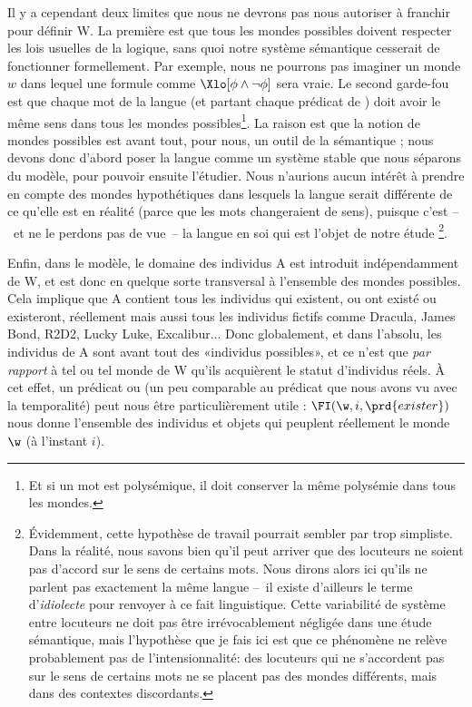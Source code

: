 
Il y a cependant deux limites que nous ne devrons pas nous autoriser à franchir pour définir \Unv W. La première est que tous les mondes possibles doivent respecter les lois  usuelles de la logique, sans quoi notre système sémantique cesserait de fonctionner formellement. Par exemple, nous ne pourrons pas imaginer un monde $w$ dans lequel une formule comme \(\Xlo[\phi\wedge\neg\phi]\) sera vraie. 
Le second garde-fou est que chaque mot de la langue (et partant chaque prédicat de {\LO}) doit avoir le même sens dans tous les mondes possibles\footnote{Et si un mot est polysémique, il doit conserver la même polysémie dans tous les mondes.}.  
La raison est que la notion de mondes possibles est avant tout, pour nous, un outil de la sémantique ;  nous devons donc d'abord poser la langue comme un système stable que nous séparons du modèle, pour pouvoir ensuite l'étudier.
Nous n'aurions aucun intérêt à prendre en compte des mondes hypothétiques dans lesquels la langue serait \pagebreak différente de ce qu'elle est en réalité (parce que les mots changeraient de sens), puisque c'est --~et ne le perdons pas de vue~-- la langue en soi qui est l'objet de notre étude%
\footnote{Évidemment, cette hypothèse de travail pourrait sembler par trop simpliste.  Dans la réalité, nous savons bien qu'il peut arriver que des locuteurs ne soient pas d'accord sur le sens de certains mots.  Nous dirons alors ici qu'ils ne parlent pas exactement la même langue --~il existe d'ailleurs le terme d'\emph{idiolecte} pour renvoyer à ce fait linguistique.  Cette variabilité de système entre locuteurs ne doit pas être irrévocablement négligée dans une étude sémantique, mais l'hypothèse que je fais ici est que ce phénomène ne relève probablement pas de l'intensionnalité: des locuteurs qui ne s'accordent pas sur le sens de certains mots ne se placent pas des mondes différents, mais dans des contextes discordants.}. 

\largerpage

Enfin, dans le modèle, le domaine des individus \Unv A est introduit indépendamment de \Unv W, et est donc en quelque sorte transversal à l'ensemble des mondes possibles. Cela implique que \Unv A contient tous les individus qui existent, ou ont existé ou existeront, réellement mais aussi tous les individus fictifs comme Dracula, James Bond, R2D2, Lucky Luke, Excalibur... %
Donc globalement, et dans l'absolu, les individus de \Unv A sont avant tout des «individus possibles», et ce n'est que \emph{par rapport} à tel ou tel monde de \Unv W qu'ils acquièrent le statut d'individus réels. À cet effet, un prédicat \label{prd:exister} 
ou  (un peu comparable au prédicat  que nous avons vu avec la temporalité)
peut nous être particulièrement utile : $\FI(\w,i,\prd{exister})$ nous donne l'ensemble des individus et objets qui peuplent réellement le monde $\w$ (à l'instant $i$).  

